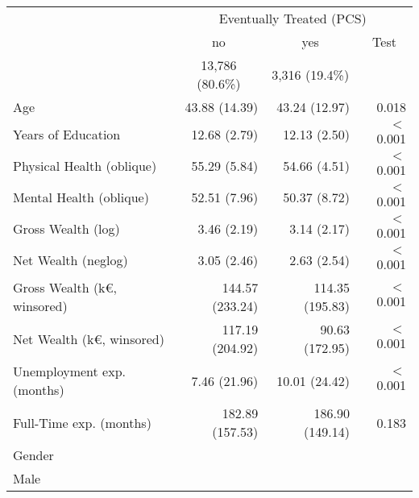 \begin{tabular}{llll}
\cmidrule{1-4}
\multicolumn{1}{r}{} &
  \multicolumn{3}{c}{Eventually Treated (PCS)} \\
\multicolumn{1}{r}{} &
  \multicolumn{1}{c}{no} &
  \multicolumn{1}{c}{yes} &
  \multicolumn{1}{c}{Test} \\
\multicolumn{1}{r}{} &
  \multicolumn{1}{c}{13,786 (80.6\%)} &
  \multicolumn{1}{c}{3,316 (19.4\%)} &
  \multicolumn{1}{r}{} \\
\cmidrule{1-4}
\multicolumn{1}{l}{Age} &
  \multicolumn{1}{r}{43.88 (14.39)} &
  \multicolumn{1}{r}{43.24 (12.97)} &
  \multicolumn{1}{r}{0.018} \\
\multicolumn{1}{l}{Years of Education} &
  \multicolumn{1}{r}{12.68 (2.79)} &
  \multicolumn{1}{r}{12.13 (2.50)} &
  \multicolumn{1}{r}{$<$0.001} \\
\multicolumn{1}{l}{Physical Health (oblique)} &
  \multicolumn{1}{r}{55.29 (5.84)} &
  \multicolumn{1}{r}{54.66 (4.51)} &
  \multicolumn{1}{r}{$<$0.001} \\
\multicolumn{1}{l}{Mental Health (oblique)} &
  \multicolumn{1}{r}{52.51 (7.96)} &
  \multicolumn{1}{r}{50.37 (8.72)} &
  \multicolumn{1}{r}{$<$0.001} \\
\multicolumn{1}{l}{Gross Wealth (log)} &
  \multicolumn{1}{r}{3.46 (2.19)} &
  \multicolumn{1}{r}{3.14 (2.17)} &
  \multicolumn{1}{r}{$<$0.001} \\
\multicolumn{1}{l}{Net Wealth (neglog)} &
  \multicolumn{1}{r}{3.05 (2.46)} &
  \multicolumn{1}{r}{2.63 (2.54)} &
  \multicolumn{1}{r}{$<$0.001} \\
\multicolumn{1}{l}{Gross Wealth (k€, winsored)} &
  \multicolumn{1}{r}{144.57 (233.24)} &
  \multicolumn{1}{r}{114.35 (195.83)} &
  \multicolumn{1}{r}{$<$0.001} \\
\multicolumn{1}{l}{Net Wealth (k€, winsored)} &
  \multicolumn{1}{r}{117.19 (204.92)} &
  \multicolumn{1}{r}{90.63 (172.95)} &
  \multicolumn{1}{r}{$<$0.001} \\
\multicolumn{1}{l}{Unemployment exp. (months)} &
  \multicolumn{1}{r}{7.46 (21.96)} &
  \multicolumn{1}{r}{10.01 (24.42)} &
  \multicolumn{1}{r}{$<$0.001} \\
\multicolumn{1}{l}{Full-Time exp. (months)} &
  \multicolumn{1}{r}{182.89 (157.53)} &
  \multicolumn{1}{r}{186.90 (149.14)} &
  \multicolumn{1}{r}{0.183} \\
\multicolumn{1}{l}{Gender} &
  \multicolumn{1}{r}{} &
  \multicolumn{1}{r}{} &
  \multicolumn{1}{r}{} \\
\multicolumn{1}{l}{\hspace{1em}Male} &

\end{tabular}
